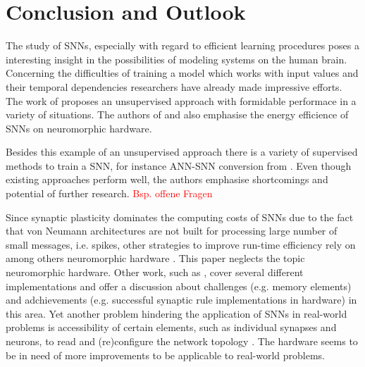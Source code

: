 \section{Conclusion and Outlook}
\label{sec:conclusion}

The study of \acp{SNN}, especially with regard to efficient learning procedures poses a interesting insight in the possibilities of modeling
systems on the human brain.
Concerning the difficulties of training a model which works with input values and their temporal dependencies researchers have already made 
impressive efforts.
The work of \cite{SNN} proposes an unsupervised approach with formidable performace in a variety of situations.
The authors of \cite{SNN} and \cite{Synaptic_plasticity} also emphasise the energy efficience of \acp{SNN} on neuromorphic hardware.

Besides this example of an unsupervised approach there is a variety of supervised methods to train a \ac{SNN}, 
for instance \ac{ANN}-\ac{SNN} conversion from \cite{DIET_SNN}.
Even though existing approaches perform well, the authors emphasise shortcomings and potential of further research.
\textcolor{red}{Bsp. offene Fragen}

Since synaptic plasticity dominates the computing costs of \acp{SNN} due to the fact that von Neumann architectures are not built for processing large number of small messages, i.e. spikes, 
other strategies to improve run-time efficiency rely on among others neuromorphic hardware \cite{simulation_STDP}.
This paper neglects the topic neuromorphic hardware.
Other work, such as \cite{Synaptic_plasticity}, 
cover several different implementations and offer a discussion about challenges (e.g. memory elements) and adchievements 
(e.g. successful synaptic rule implementations in hardware) in this area.
Yet another problem hindering the application of \acp{SNN} in real-world problems is accessibility of certain elements, such as individual synapses and neurons, 
to read and (re)configure the network topology \cite{hardware_STDP}.
The hardware seems to be in need of more improvements to be applicable to real-world problems.